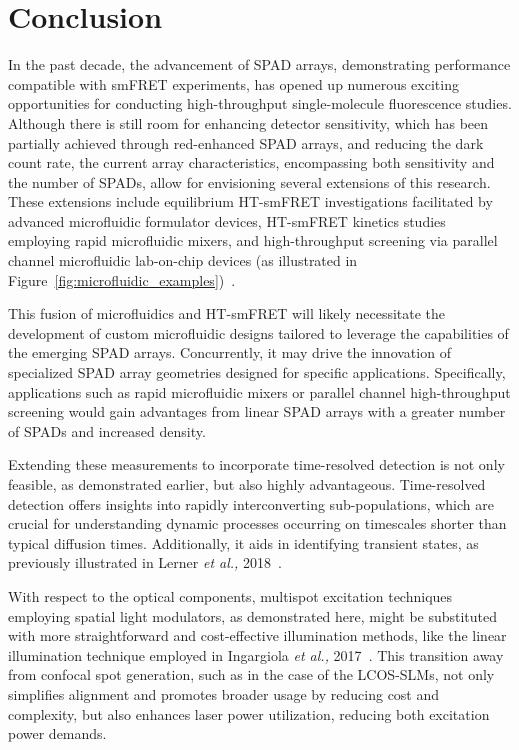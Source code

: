 \chapter{Conclusion}
\label{chpt:conclusion}

In the past decade, the advancement of \ac{SPAD} arrays, demonstrating performance compatible with \ac{smFRET} experiments, has opened up numerous exciting opportunities for conducting high-throughput single-molecule fluorescence studies. 
Although there is still room for enhancing detector sensitivity, which has been partially achieved through red-enhanced \ac{SPAD} arrays, and reducing the dark count rate, the current array characteristics, encompassing both sensitivity and the number of \ac{SPAD}s, allow for envisioning several extensions of this research. 
These extensions include equilibrium \ac{HT-smFRET} investigations facilitated by advanced microfluidic formulator devices, \ac{HT-smFRET} kinetics studies employing rapid microfluidic mixers, and high-throughput screening via parallel channel microfluidic lab-on-chip devices (as illustrated in Figure~\ref{fig:microfluidic_examples})~\cite{streets_COB_2014,yeh_SA_2017}.

This fusion of microfluidics and \ac{HT-smFRET} will likely necessitate the development of custom microfluidic designs tailored to leverage the capabilities of the emerging \ac{SPAD} arrays. 
Concurrently, it may drive the innovation of specialized \ac{SPAD} array geometries designed for specific applications. 
Specifically, applications such as rapid microfluidic mixers or parallel channel high-throughput screening would gain advantages from linear \ac{SPAD} arrays with a greater number of \ac{SPAD}s and increased density.

Extending these measurements to incorporate time-resolved detection is not only feasible, as demonstrated earlier, but also highly advantageous. 
Time-resolved detection offers insights into rapidly interconverting sub-populations, which are crucial for understanding dynamic processes occurring on timescales shorter than typical diffusion times. 
Additionally, it aids in identifying transient states, as previously illustrated in Lerner \textit{et al.,} 2018~\cite{lerner_Science_2018}.

With respect to the optical components, multispot excitation techniques employing spatial light modulators, as demonstrated here, might be substituted with more straightforward and cost-effective illumination methods, like the linear illumination technique employed in Ingargiola \textit{et al.,} 2017~\cite{ingargiola_SPIE_2017}. 
This transition away from confocal spot generation, such as in the case of the \ac{LCOS-SLM}s, not only simplifies alignment and promotes broader usage by reducing cost and complexity, but also enhances laser power utilization, reducing both excitation power demands.

